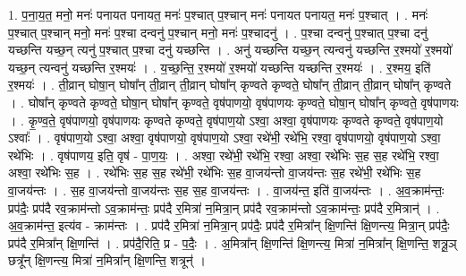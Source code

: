 \documentclass[17pt]{extarticle}
\begin{document}
1. प॒ना॒य॒त॒ मनो॒ मनः॑ पनायत पनायत॒ मनः॑ प॒श्चात् प॒श्चान् मनः॑ पनायत पनायत॒ मनः॑ प॒श्चात् । . मनः॑ प॒श्चात् प॒श्चान् मनो॒ मनः॑ प॒श्चा दन्वनु॑ प॒श्चान् मनो॒ मनः॑ प॒श्चादनु॑ । . प॒श्चा दन्वनु॑ प॒श्चात् प॒श्चा दनु॑ यच्छन्ति यच्छ॒न् त्यनु॑ प॒श्चात् प॒श्चा दनु॑ यच्छन्ति । . अनु॑ यच्छन्ति यच्छ॒न् त्यन्वनु॑ यच्छन्ति र॒श्मयो॑ र॒श्मयो॑ यच्छ॒न् त्यन्वनु॑ यच्छन्ति र॒श्मयः॑ । . य॒च्छ॒न्ति॒ र॒श्मयो॑ र॒श्मयो॑ यच्छन्ति यच्छन्ति र॒श्मयः॑ । . र॒श्मय॒ इति॑ र॒श्मयः॑ । . ती॒व्रान् घोषा॒न् घोषा᳚न् ती॒व्रान् ती॒व्रान् घोषा᳚न् कृण्वते कृण्वते॒ घोषा᳚न् ती॒व्रान् ती॒व्रान् घोषा᳚न् कृण्वते । . घोषा᳚न् कृण्वते कृण्वते॒ घोषा॒न् घोषा᳚न् कृण्वते॒ वृष॑पाणयो॒ वृष॑पाणयः कृण्वते॒ घोषा॒न् घोषा᳚न् कृण्वते॒ वृष॑पाणयः । . कृ॒ण्व॒ते॒ वृष॑पाणयो॒ वृष॑पाणयः कृण्वते कृण्वते॒ वृष॑पाण॒यो ऽश्वा॒ अश्वा॒ वृष॑पाणयः कृण्वते कृण्वते॒ वृष॑पाण॒यो ऽश्वाः᳚ । . वृष॑पाण॒यो ऽश्वा॒ अश्वा॒ वृष॑पाणयो॒ वृष॑पाण॒यो ऽश्वा॒ रथे॑भी॒ रथे॑भि॒ रश्वा॒ वृष॑पाणयो॒ वृष॑पाण॒यो ऽश्वा॒ रथे॑भिः । . वृष॑पाणय॒ इति॒ वृष॑ - पा॒ण॒यः॒ । . अश्वा॒ रथे॑भी॒ रथे॑भि॒ रश्वा॒ अश्वा॒ रथे॑भिः स॒ह स॒ह रथे॑भि॒ रश्वा॒ अश्वा॒ रथे॑भिः स॒ह । . रथे॑भिः स॒ह स॒ह रथे॑भी॒ रथे॑भिः स॒ह वा॒जय॑न्तो वा॒जय॑न्तः स॒ह रथे॑भी॒ रथे॑भिः स॒ह वा॒जय॑न्तः । . स॒ह वा॒जय॑न्तो वा॒जय॑न्तः स॒ह स॒ह वा॒जय॑न्तः । . वा॒जय॑न्त॒ इति॑ वा॒जय॑न्तः । . अ॒व॒क्राम॑न्तः॒ प्रप॑दैः॒ प्रप॑दै रव॒क्राम॑न्तो ऽव॒क्राम॑न्तः॒ प्रप॑दै र॒मित्रा॑ न॒मित्रा॒न् प्रप॑दै रव॒क्राम॑न्तो ऽव॒क्राम॑न्तः॒ प्रप॑दै र॒मित्रान्॑ । . अ॒व॒क्राम॑न्त॒ इत्य॑व - क्राम॑न्तः । . प्रप॑दै र॒मित्रा॑ न॒मित्रा॒न् प्रप॑दैः॒ प्रप॑दै र॒मित्रा᳚न् क्षि॒णन्ति॑ क्षि॒णन्त्य॒ मित्रा॒न् प्रप॑दैः॒ प्रप॑दै र॒मित्रा᳚न् क्षि॒णन्ति॑ । . प्रप॑दै॒रिति॒ प्र - प॒दैः॒ । . अ॒मित्रा᳚न् क्षि॒णन्ति॑ क्षि॒णन्त्य॒ मित्रा॑ न॒मित्रा᳚न् क्षि॒णन्ति॒ शत्रू॒ञ् छत्रू᳚न् क्षि॒णन्त्य॒ मित्रा॑ न॒मित्रा᳚न् क्षि॒णन्ति॒ शत्रून्॑ । \newline
\end{document}
